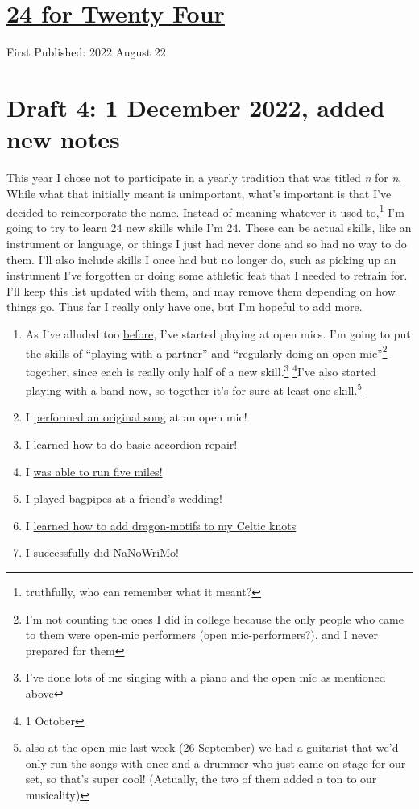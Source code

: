 \documentclass[12pt]{article}[titlepage]
\newcommand{\say}[1]{``#1''}
\newcommand{\1}{\={a}}
\newcommand{\2}{\={e}}
\newcommand{\3}{\={\i}}
\newcommand{\4}{\=o}
\newcommand{\5}{\=u}
\newcommand{\6}{\={A}}
\renewcommand{\,}{\textsuperscript{,}}
\begin{document}
\doublespacing
\section{\href{twenty-four-html}{24 for Twenty Four}}
First Published: 2022 August 22

\section{Draft 4: 1 December 2022, added new notes}
This year I chose not to participate in a yearly tradition that was titled \textit{n} for \textit{n}.
While what that initially meant is unimportant, what's important is that I've decided to reincorporate the name.
Instead of meaning whatever it used to,\footnote{truthfully, who can remember what it meant?} I'm going to try to learn 24 new skills while I'm 24.
These can be actual skills, like an instrument or language, or things I just had never done and so had no way to do them.
I'll also include skills I once had but no longer do, such as picking up an instrument I've forgotten or doing some athletic feat that I needed to retrain for.
I'll keep this list updated with them, and may remove them depending on how things go.
Thus far I really only have one, but I'm hopeful to add more.

\begin{enumerate}
\item As I've alluded too \href{open-mic-2.html}{before}, I've started playing at open mics.
I'm going to put the skills of \say{playing with a partner} and \say{regularly doing an open mic}\footnote{I'm not counting the ones I did in college because the only people who came to them were open-mic performers (open mic-performers?), and I never prepared for them} together, since each is really only half of a new skill.\footnote{I've done lots of me singing with a piano and the open mic as mentioned above} \footnote{1 October}I've also started playing with a band now, so together it's for sure at least one skill.\footnote{also at the open mic last week (26 September) we had a guitarist that we'd only run the songs with once and a drummer who just came on stage for our set, so that's super cool! (Actually, the two of them added a ton to our musicality)}
\item I \href{performing-a-song.html}{performed an original song} at an open mic!
\item I learned how to do \href{accordion-repair.html}{basic accordion repair!}
\item I \href{running-2.html}{was able to run five miles!} 
\item I \href{bagpipes.html}{played bagpipes at a friend's wedding!}
\item I \href{celtic-knots.html}{learned how to add dragon-motifs to my Celtic knots}
\item I \href{nanowrimo-4.html}{successfully did NaNoWriMo}!
\end{enumerate}
\end{document}

